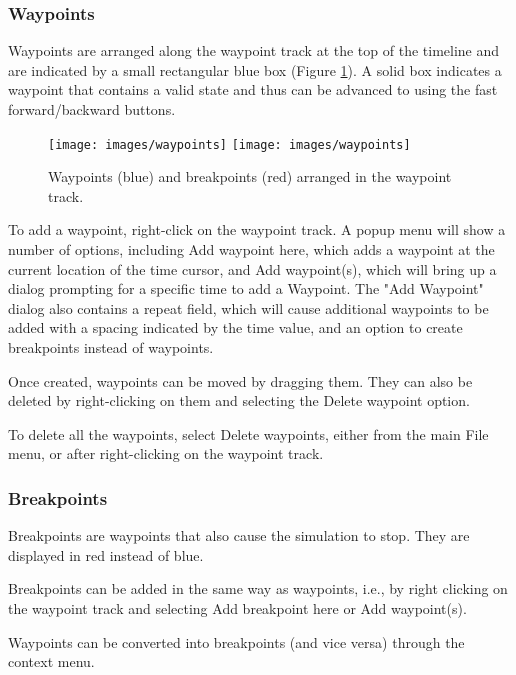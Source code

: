 \documentclass{article}
\begin{document}
\subsubsection{Waypoints}
\label{Waypoints:sec}

Waypoints are arranged along the waypoint track at the top of the
timeline and are indicated by a small rectangular blue box
(Figure \ref{waypointsFig}). A solid box indicates a waypoint that contains a
valid state and thus can be advanced to using the fast forward/backward
buttons.

\begin{figure}
\begin{center}
\iflatexml
\texttt{[image: images/waypoints]}
\else
\texttt{[image: images/waypoints]}
\fi
\end{center}
\caption{Waypoints (blue) and breakpoints (red) arranged in the waypoint track.}%
\label{waypointsFig}
\end{figure}

To add a waypoint, right-click on the waypoint track.  A popup menu will
show a number of options, including {\sf Add waypoint here}, which adds a
waypoint at the current location of the time cursor, and {\sf Add
waypoint(s)}, which will bring up a dialog prompting for a specific time
to add a Waypoint. The "Add Waypoint" dialog also contains a {\sf repeat}
field, which will cause additional waypoints to be added with a spacing
indicated by the time value, and an option to create breakpoints instead
of waypoints.

Once created, waypoints can be moved by dragging them. They can also
be deleted by right-clicking on them and selecting the {\sf Delete waypoint}
option.

To delete all the waypoints, select {\sf Delete waypoints}, either
from the main {\sf File} menu, or after right-clicking on the waypoint
track.

\subsubsection{Breakpoints}

Breakpoints are waypoints that also cause the simulation to stop.
They are displayed in red instead of blue.

Breakpoints can be added in the same way as waypoints, i.e., by right
clicking on the waypoint track and selecting {\sf Add breakpoint here} or
{\sf Add waypoint(s)}.

Waypoints can be converted into breakpoints (and vice versa) through
the context menu.
\end{document}
